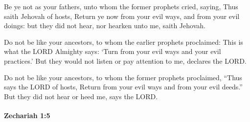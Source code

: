 			\begin{versebox}
					\item[BHS] 
					\item[LXX] 
					\item[ASV] Be ye not as your fathers, unto whom the former prophets cried, saying, Thus saith Jehovah of hosts, Return ye now from your evil ways, and from your evil doings: but they did not hear, nor hearken unto me, saith Jehovah.
					\item[NIV] Do not be like your ancestors, to whom the earlier prophets proclaimed: This is what the LORD Almighty says: ‘Turn from your evil ways and your evil practices.’ But they would not listen or pay attention to me, declares the LORD.
					\item[NRSV] Do not be like your ancestors, to whom the former prophets proclaimed, “Thus says the LORD of hosts, Return from your evil ways and from your evil deeds.” But they did not hear or heed me, says the LORD.
			\end{versebox}

		\paragraph{Zechariah 1:5} %
			\label{ZECHARIAH-1-5}

